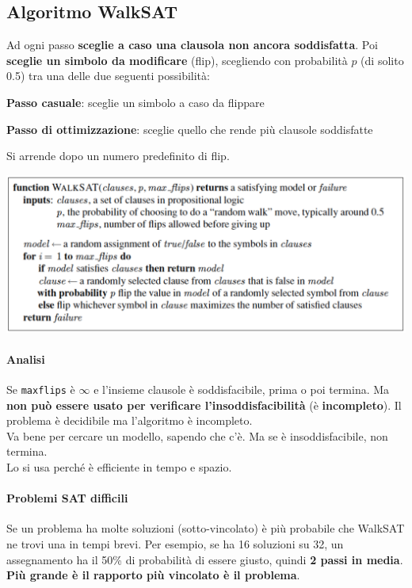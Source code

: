 \documentclass[10pt]{book}
\begin{document}
\subsection{Algoritmo WalkSAT}
Ad ogni passo \textbf{sceglie a caso una clausola non ancora soddisfatta}. Poi \textbf{sceglie un simbolo da modificare} (flip), scegliendo con probabilità $p$ (di solito 0.5) tra una delle due seguenti possibilità:
\begin{list}{}{}
	\item \textbf{Passo casuale}: sceglie un simbolo a caso da flippare
	\item \textbf{Passo di ottimizzazione}: sceglie quello che rende più clausole soddisfatte
\end{list}
Si arrende dopo un numero predefinito di flip.
\begin{center}
	\includegraphics[scale=0.6]{walksatalgoritmo.png}
\end{center}
\paragraph{Analisi} Se \texttt{maxflips} è $\infty$ e l'insieme clausole è soddisfacibile, prima o poi termina. Ma \textbf{non può essere usato per verificare l'insoddisfacibilità} (è \textbf{incompleto}). Il problema è decidibile ma l'algoritmo è incompleto.\\
Va bene per cercare un modello, sapendo che c'è. Ma se è insoddisfacibile, non termina.\\
Lo si usa perché è efficiente in tempo e spazio.
\paragraph{Problemi SAT difficili} Se un problema ha molte soluzioni (sotto-vincolato) è più probabile che WalkSAT ne trovi una in tempi brevi. Per esempio, se ha 16 soluzioni su 32, un assegnamento ha il 50\% di probabilità di essere giusto, quindi \textbf{2 passi in media}.\\
\textbf{Più grande è il rapporto più vincolato è il problema}.
\end{document}
